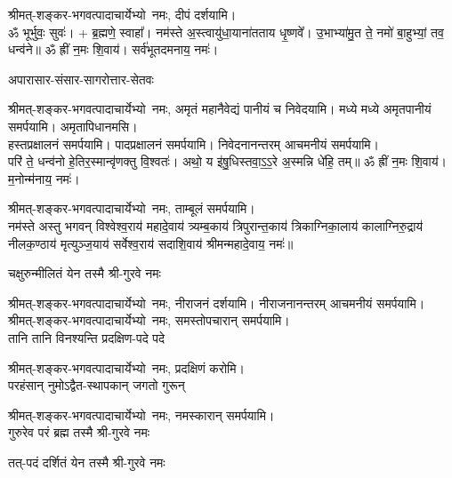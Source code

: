 \begin{center}
श्रीमत्-शङ्कर-भगवत्पादाचार्येभ्यो~नमः, दीपं दर्शयामि।\\


ॐ भूर्भुवः॒ सुवः॑। + ब्र॒ह्मणे॒ स्वाहा᳚। नम॑स्ते अ॒स्त्वायु॑धा॒याना॑तताय धृ॒ष्णवे᳚। उ॒भाभ्या॑मु॒त ते॒ नमो॑ बा॒हुभ्यां॒ तव॒ धन्व॑ने॥ ॐ ह्रीं न॒मः शि॒वाय॑। सर्व॑भूतदमनाय॒ नमः॑। 

{अपारासार-संसार-सागरोत्तार-सेतवः}

श्रीमत्-शङ्कर-भगवत्पादाचार्येभ्यो~नमः, अमृतं महानैवेद्यं पानीयं च निवेदयामि। मध्ये मध्ये अमृतपानीयं समर्पयामि। अमृतापिधानमसि।\\
हस्तप्रक्षालनं समर्पयामि। पादप्रक्षालनं समर्पयामि। निवेदनानन्तरम् आचमनीयं समर्पयामि।\\


परि॑ ते॒ धन्व॑नो हे॒तिर॒स्मान्वृ॑णक्तु वि॒श्वतः॑। अथो॒ य इ॑षु॒धिस्तवा॒ऽ॒ऽ॒रे अ॒स्मन्नि धे॑हि॒ तम्॥ ॐ ह्रीं न॒मः शि॒वाय॑। म॒नोन्म॑नाय॒ नमः॑। 


श्रीमत्-शङ्कर-भगवत्पादाचार्येभ्यो~नमः, ताम्बूलं समर्पयामि।\\

नम॑स्ते अस्तु भगवन् विश्वेश्व॒राय॑ महादे॒वाय॑ त्र्यम्ब॒काय॑ त्रिपुरान्त॒काय॑ त्रिकाग्निका॒लाय॑ कालाग्निरु॒द्राय॑ नीलक॒ण्ठाय॑ मृत्युञ्ज॒याय॑ सर्वेश्व॒राय॑ सदाशि॒वाय॑ श्रीमन्महादे॒वाय॒ नमः॑॥

{चक्षुरुन्मीलितं येन तस्मै श्री-गुरवे नमः}

श्रीमत्-शङ्कर-भगवत्पादाचार्येभ्यो~नमः, नीराजनं दर्शयामि। नीराजनानन्तरम् आचमनीयं समर्पयामि।\\

श्रीमत्-शङ्कर-भगवत्पादाचार्येभ्यो~नमः, समस्तोपचारान् समर्पयामि।\\


{तानि तानि विनश्यन्ति प्रदक्षिण-पदे पदे}

श्रीमत्-शङ्कर-भगवत्पादाचार्येभ्यो~नमः, प्रदक्षिणं करोमि।\\

{परहंसान् नुमोऽद्वैत-स्थापकान् जगतो गुरून्}

श्रीमत्-शङ्कर-भगवत्पादाचार्येभ्यो~नमः, नमस्कारान् समर्पयामि।\\

{गुरुरेव परं ब्रह्म तस्मै श्री-गुरवे नमः}

{तत्-पदं दर्शितं येन तस्मै श्री-गुरवे नमः}


\end{center}
